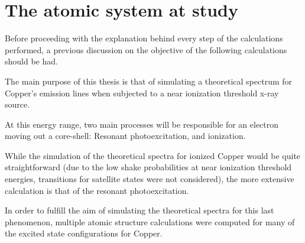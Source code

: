 % 
%  


\section{The atomic system at study}

Before proceeding with the explanation behind every step of the calculations performed, a previous discussion on the objective of the following calculations should be had.


The main purpose of this thesis is that of simulating a theoretical spectrum for Copper's emission lines when subjected to a near ionization threshold x-ray source.

At this energy range, two main processes will be responsible for an electron moving out a core-shell: Resonant photoexcitation, and ionization.

While the simulation of the theoretical spectra for ionized Copper would be quite straightforward (due to the low shake probabilities at near ionization threshold energies, transitions for satellite states were not considered), the more extensive calculation is that of the resonant photoexcitation.

In order to fulfill the aim of simulating the theoretical spectra for this last phenomenon, multiple atomic structure calculations were computed for many of the excited state configurations for Copper.

